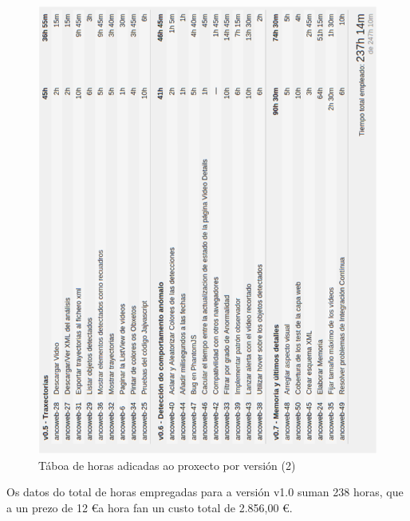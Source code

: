 \begin{figure}[htp]
\begin{center}
    \includegraphics[scale=0.7]{figures/YouTrack/taboaHoras2_2.png}
    \caption{Táboa de horas adicadas ao proxecto por versión (2)}
\label{fig:taboaHoras2_2}
\end{center}
\end{figure}

Os datos do total de horas empregadas para a versión v1.0 suman 238 horas, que a un prezo de 
12 \euro a hora fan un custo total de 2.856,00 \euro.
